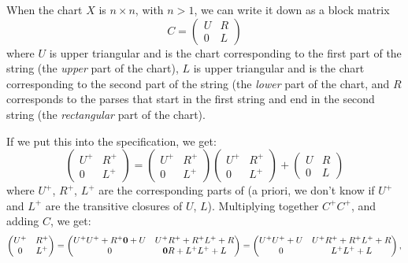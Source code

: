 \documentclass{article}
\begin{document}
When the chart $X$ is $n \times n$, with $n > 1$, we can write it down as a block matrix 
\begin{equation*}
  C = 
  \begin{pmatrix}
    U & R \\
    0 & L
  \end{pmatrix}
\end{equation*}
where $U$ is upper triangular and is the chart corresponding to the first part of the string (the \emph{upper} part of the chart), $L$ is upper triangular and is the chart corresponding to the second part of the string (the \emph{lower} part of the chart, and $R$ corresponds to the parses that start in the first string and end in the second string (the \emph{rectangular} part of the chart).

If we put this into the specification, we get:
\begin{equation*}
  \begin{pmatrix}
    U^+ & R^+ \\
    0   & L^+
  \end{pmatrix}
  =  
  \begin{pmatrix}
    U^+ & R^+ \\
    0   & L^+
  \end{pmatrix}
  \begin{pmatrix}
    U^+ & R^+ \\
    0   & L^+
  \end{pmatrix}
  +
  \begin{pmatrix}
    U & R \\
    0 & L
  \end{pmatrix}
\end{equation*}
where $U^+$, $R^+$, $L^+$ are the corresponding parts of (a priori, we don't know if $U^+$ and $L^+$ are the transitive closures of $U$, $L$). Multiplying together $C^+C^+$, and adding $C$, we get:
\begin{equation*}
    \begin{pmatrix}
    U^+ & R^+ \\
    0   & L^+
  \end{pmatrix} 
    =
  \begin{pmatrix}
    U^+U^+ + R^+\mathbf{0} + U   &   U^+R^+     + R^+L^+ + R \\
    0                          &   \mathbf{0} R + L^+L^+ + L
  \end{pmatrix}
  = 
  \begin{pmatrix}
    U^+U^+ + U                 &   U^+R^+ + R^+L^+ + R \\
    0                          &   L^+L^+ + L
  \end{pmatrix},
\end{equation*}
\end{document}
